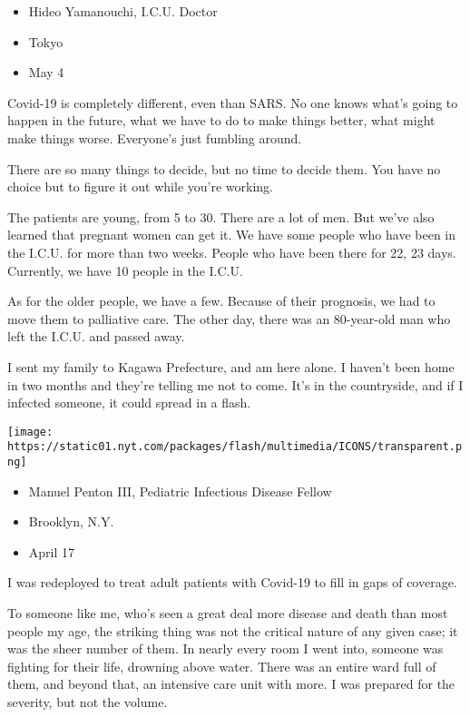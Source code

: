 \begin{itemize}
\tightlist
\item
  Hideo Yamanouchi, I.C.U. Doctor
\item
  Tokyo
\item
  May 4
\end{itemize}

Covid-19 is completely different, even than SARS. No one knows what's
going to happen in the future, what we have to do to make things better,
what might make things worse. Everyone's just fumbling around.

There are so many things to decide, but no time to decide them. You have
no choice but to figure it out while you're working.

The patients are young, from 5 to 30. There are a lot of men. But we've
also learned that pregnant women can get it. We have some people who
have been in the I.C.U. for more than two weeks. People who have been
there for 22, 23 days. Currently, we have 10 people in the I.C.U.

As for the older people, we have a few. Because of their prognosis, we
had to move them to palliative care. The other day, there was an
80-year-old man who left the I.C.U. and passed away.

I sent my family to Kagawa Prefecture, and am here alone. I haven't been
home in two months and they're telling me not to come. It's in the
countryside, and if I infected someone, it could spread in a flash.

\texttt{[image: https://static01.nyt.com/packages/flash/multimedia/ICONS/transparent.png]}

\begin{itemize}
\tightlist
\item
  Manuel Penton III, Pediatric Infectious Disease Fellow
\item
  Brooklyn, N.Y.
\item
  April 17
\end{itemize}

I was redeployed to treat adult patients with Covid-19 to fill in gaps
of coverage.

To someone like me, who's seen a great deal more disease and death than
most people my age, the striking thing was not the critical nature of
any given case; it was the sheer number of them. In nearly every room I
went into, someone was fighting for their life, drowning above water.
There was an entire ward full of them, and beyond that, an intensive
care unit with more. I was prepared for the severity, but not the
volume.

